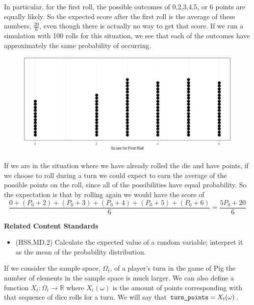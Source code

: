 \documentclass[
]{book}
\providecommand{\tightlist}{%
  \setlength{\itemsep}{0pt}\setlength{\parskip}{0pt}}
\newenvironment{standards}{}{}
\theoremstyle{definition}
\theoremstyle{definition}
\theoremstyle{definition}
\theoremstyle{definition}
\theoremstyle{remark}
\begin{document}
In particular, for the first roll, the possible outcomes of 0,2,3,4,5, or 6 points are equally likely. So the expected score after the first roll is the average of these numbers, \(\frac{20}{6}\), even though there is actually no way to get that score. If we run a simulation with 100 rolls for this situation, we see that each of the outcomes have approximately the same probability of occurring.

\begin{figure}

{\centering \includegraphics[width=0.8\linewidth]{images/OneRoll} 

}

\end{figure}

If we are in the situation where we have already rolled the die and have points, if we choose to roll during a turn we could expect to earn the average of the possible points on the roll, since all of the possibilities have equal probability. So the expectation is that by rolling again we would have the score of
\[\frac{0+(P_0 + 2) + (P_0 + 3) + (P_0+4) + (P_0+5) + (P_0+6) }{6} = \frac{5P_0 + 20}{6}\]

\begin{standards}

\begin{center}
\textbf{Related Content Standards}

\end{center}

\begin{itemize}
\tightlist
\item
  (HSS.MD.2) Calculate the expected value of a random variable; interpret it as the mean of the probability distribution.
\end{itemize}

\end{standards}

If we consider the sample space, \(\Omega_t\), of a player's turn in the game of Pig the number of elements in the sample space is much larger. We can also define a function \(X_t:\Omega_t \rightarrow \mathbb{R}\) where \(X_t(\omega)\) is the amount of points corresponding with that sequence of dice rolls for a turn. We will say that \(\verb|turn_points| = X_t(\omega)\).
\end{document}

